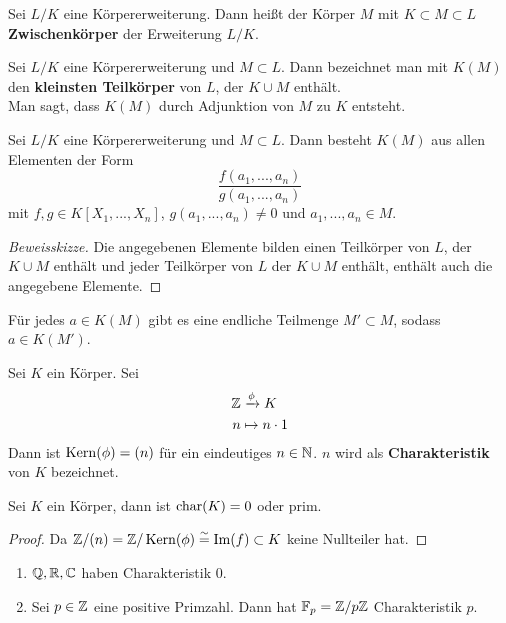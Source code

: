 	\begin{definition}
		Sei $L/K$ eine Körpererweiterung. Dann heißt der Körper $M$ mit $K\subset M\subset L$ \textbf{Zwischenkörper} der Erweiterung $L/K$.
	\end{definition}

	\begin{definition}
		Sei $L/K$ eine Körpererweiterung und $M\subset L$. Dann bezeichnet man mit $K(M)$ den \textbf{kleinsten Teilkörper} von $L$, der $K\cup M$ enthält.\\
		Man sagt, dass $K(M)$ durch Adjunktion von $M$ zu $K$ entsteht.
	\end{definition}

	\begin{prop}
		Sei $L/K$ eine Körpererweiterung und $M\subset L$. Dann besteht $K(M)$ aus allen Elementen der Form
		\[\frac{f(a_1,...,a_n)}{g(a_1,...,a_n)}\]
		mit $f,g\in K[X_1,...,X_n]$, $g(a_1,...,a_n)\neq 0$ und $a_1,...,a_n\in M$.
	\end{prop}
	\begin{proof}[Beweisskizze]
		Die angegebenen Elemente bilden einen Teilkörper von $L$, der $K\cup M$ enthält und jeder Teilkörper von $L$ der $K\cup M$ enthält, enthält auch die angegebene Elemente.
	\end{proof}

	\begin{prop}
		Für jedes $a\in K(M)$ gibt es eine endliche Teilmenge $M'\subset M$, sodass $a\in K(M')$.
	\end{prop}

	\begin{definition}
		Sei $K$ ein Körper. Sei\begin{align*}
		\mathbb{Z}&\xrightarrow{\phi}K\\
		n&\mapsto n\cdot 1
		\end{align*}
		Dann ist $\operatorname{Kern}(\phi)=(n)$ für ein eindeutiges $n\in \mathbb{N}$. $n$ wird als \textbf{Charakteristik} von $K$ bezeichnet.
	\end{definition}

	\begin{kor}
		Sei $K$ ein Körper, dann ist $\operatorname{char}(K)=0$ oder prim.
	\end{kor}
	\begin{proof}
		Da $\mathbb{Z}/(n)=\mathbb{Z}/\operatorname{Kern}(\phi)\overset{\sim}{=}\operatorname{Im}(f)\subset K$ keine Nullteiler hat.
	\end{proof}

	\begin{exm}
		\begin{enumerate}
			\item $\mathbb{Q},\mathbb{R},\mathbb{C}$ haben Charakteristik 0.
			\item Sei $p\in\mathbb{Z}$ eine positive Primzahl. Dann hat $\mathbb{F}_p=\mathbb{Z}/p\mathbb{Z}$ Charakteristik $p$.
		\end{enumerate}
	\end{exm}

